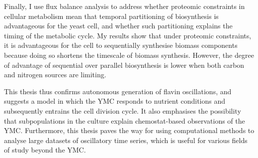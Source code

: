 {  Finally, I use flux balance analysis to address whether proteomic constraints in cellular metabolism mean that temporal partitioning of biosynthesis is advantageous for the yeast cell, and whether such partitioning explains the timing of the metabolic cycle.
  My results show that under proteomic constraints, it is advantageous for the cell to sequentially synthesise biomass components because doing so shortens the timescale of biomass synthesis.
  However, the degree of advantage of sequential over parallel biosynthesis is lower when both carbon and nitrogen sources are limiting.

  This thesis thus confirms autonomous generation of flavin oscillations, and suggests a model in which the YMC responds to nutrient conditions and subsequently entrains the cell division cycle.
  It also emphasises the possibility that subpopulations in the culture explain chemostat-based observations of the YMC\@.
  Furthermore, this thesis paves the way for using computational methods to analyse large datasets of oscillatory time series, which is useful for various fields of study beyond the YMC\@.
}


